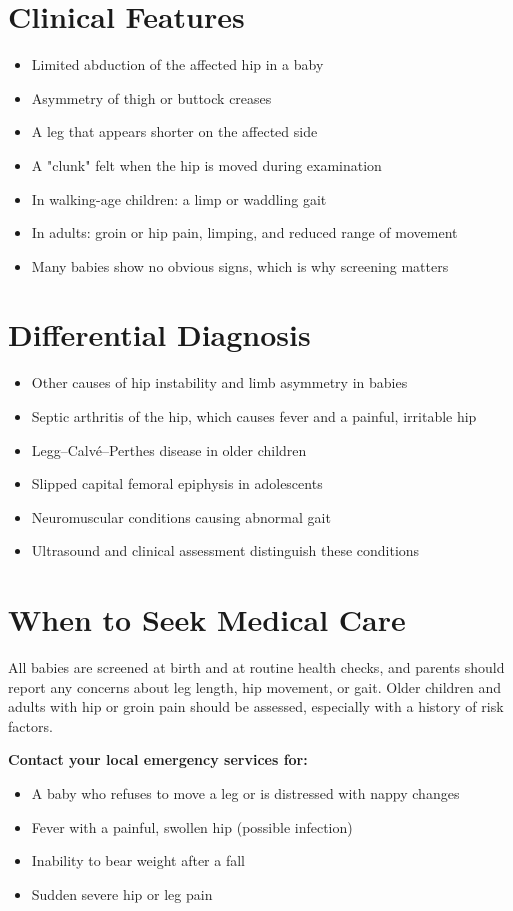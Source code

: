 \section*{Clinical Features}
\begin{itemize}
    \item Limited abduction of the affected hip in a baby
    \item Asymmetry of thigh or buttock creases
    \item A leg that appears shorter on the affected side
    \item A "clunk" felt when the hip is moved during examination
    \item In walking-age children: a limp or waddling gait
    \item In adults: groin or hip pain, limping, and reduced range of movement
    \item Many babies show no obvious signs, which is why screening matters
\end{itemize}

\section*{Differential Diagnosis}
\begin{itemize}
    \item Other causes of hip instability and limb asymmetry in babies
    \item Septic arthritis of the hip, which causes fever and a painful, irritable hip
    \item Legg--Calvé--Perthes disease in older children
    \item Slipped capital femoral epiphysis in adolescents
    \item Neuromuscular conditions causing abnormal gait
    \item Ultrasound and clinical assessment distinguish these conditions
\end{itemize}

\section*{When to Seek Medical Care}
All babies are screened at birth and at routine health checks, and parents should report any concerns about leg length, hip movement, or gait. Older children and adults with hip or groin pain should be assessed, especially with a history of risk factors.

\textbf{Contact your local emergency services for:}
\begin{itemize}
    \item A baby who refuses to move a leg or is distressed with nappy changes
    \item Fever with a painful, swollen hip (possible infection)
    \item Inability to bear weight after a fall
    \item Sudden severe hip or leg pain
\end{itemize}


